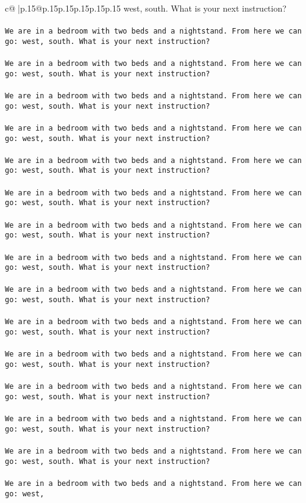 \documentclass{article}
\begin{document}
{\begin{supertabular}{c@{$\;$}|p{.15\linewidth}@{}p{.15\linewidth}p{.15\linewidth}p{.15\linewidth}p{.15\linewidth}p{.15\linewidth}}
{{{west, south. What is your next instruction?\\ \tt \\ \tt We are in a bedroom with two beds and a nightstand. From here we can go: west, south. What is your next instruction?\\ \tt \\ \tt We are in a bedroom with two beds and a nightstand. From here we can go: west, south. What is your next instruction?\\ \tt \\ \tt We are in a bedroom with two beds and a nightstand. From here we can go: west, south. What is your next instruction?\\ \tt \\ \tt We are in a bedroom with two beds and a nightstand. From here we can go: west, south. What is your next instruction?\\ \tt \\ \tt We are in a bedroom with two beds and a nightstand. From here we can go: west, south. What is your next instruction?\\ \tt \\ \tt We are in a bedroom with two beds and a nightstand. From here we can go: west, south. What is your next instruction?\\ \tt \\ \tt We are in a bedroom with two beds and a nightstand. From here we can go: west, south. What is your next instruction?\\ \tt \\ \tt We are in a bedroom with two beds and a nightstand. From here we can go: west, south. What is your next instruction?\\ \tt \\ \tt We are in a bedroom with two beds and a nightstand. From here we can go: west, south. What is your next instruction?\\ \tt \\ \tt We are in a bedroom with two beds and a nightstand. From here we can go: west, south. What is your next instruction?\\ \tt \\ \tt We are in a bedroom with two beds and a nightstand. From here we can go: west, south. What is your next instruction?\\ \tt \\ \tt We are in a bedroom with two beds and a nightstand. From here we can go: west, south. What is your next instruction?\\ \tt \\ \tt We are in a bedroom with two beds and a nightstand. From here we can go: west, south. What is your next instruction?\\ \tt \\ \tt We are in a bedroom with two beds and a nightstand. From here we can go: west, south. What is your next instruction?\\ \tt \\ \tt We are in a bedroom with two beds and a nightstand. From here we can go: west, }}}
\end{supertabular}}
\end{document}
